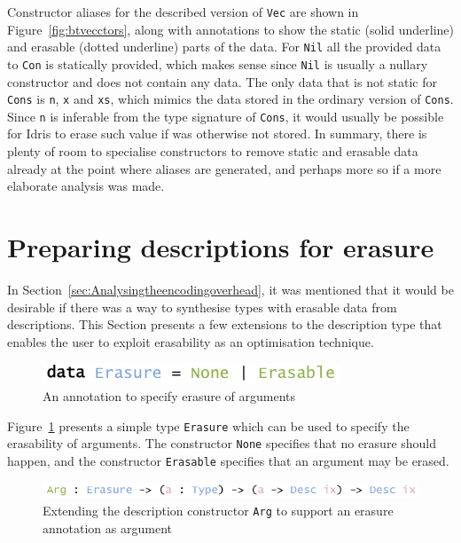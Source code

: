 \documentclass{ituthesis}
\newcommand{\ttconstructor}[1]{\textcolor{constructor-color}{\texttt{#1}}}
\newcommand{\tttype}[1]{\textcolor{type-color}{\texttt{#1}}}
\newcommand{\ttdec}[1]{\textcolor{declared-var-color}{\texttt{#1}}}
\newcommand{\ttvar}[1]{\textcolor{local-var-color}{\texttt{#1}}}
\theoremstyle{break}
\begin{document}
Constructor aliases for the described version of \tttype{Vec} are shown in Figure~\ref{fig:btvecctors}, along with annotations to show the static (solid underline) and erasable (dotted underline) parts
of the data. For \ttdec{Nil} all the provided data to \ttconstructor{Con} is statically provided, which makes sense since \ttconstructor{Nil} is usually a nullary constructor and does not contain any data.
The only data that is not static for \ttdec{Cons} is \ttvar{n}, \ttvar{x} and \ttvar{xs}, which mimics the data stored in the ordinary version of \ttconstructor{Cons}.
Since \ttvar{n} is inferable from the type signature of \ttdec{Cons}, it would usually be possible for Idris to erase such value if was otherwise not stored.
In summary, there is plenty of room to specialise constructors to remove static and erasable data already at the point where aliases are generated, and perhaps more so if a more elaborate analysis was made.

\section{Preparing descriptions for erasure}
\label{sec:Preparingdescriptionsforerasure}
In Section~\ref{sec:Analysingtheencodingoverhead}, it was mentioned that it would be desirable if there was a way to synthesise types with erasable data from descriptions.
This Section presents a few extensions to the description type that enables the user to exploit erasability as an optimisation technique.

\begin{figure}[ht]
\begin{center}
    \includegraphics[scale=0.5]{Figures/ErasureType.png}
\end{center}
\caption{An annotation to specify erasure of arguments}
\label{fig:erasety}
\end{figure}

Figure~\ref{fig:erasety} presents a simple type \tttype{Erasure} which can be used to specify the erasability of arguments.
The constructor \ttconstructor{None} specifies that no erasure should happen, and the constructor \ttconstructor{Erasable} specifies that an argument may be erased.

\begin{figure}[ht]
\begin{center}
    \includegraphics[scale=0.5]{Figures/DescriptionWithErasure.png}
\end{center}
\caption{Extending the description constructor \ttconstructor{Arg} to support an erasure annotation as argument}
\label{fig:erasedesc}
\end{figure}
\end{document}
